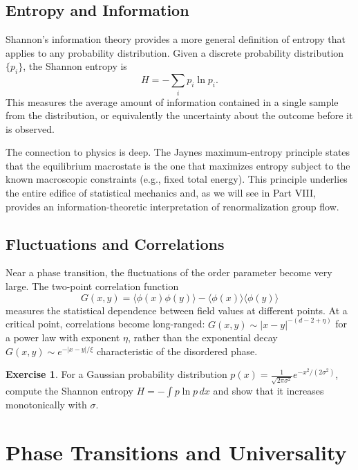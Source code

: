 \documentclass[12pt,a4paper,oneside]{book}
\theoremstyle{definition}
\newtheorem{exercise}{Exercise}[chapter]
\theoremstyle{plain}
\theoremstyle{remark}
\begin{document}
\section{Entropy and Information}

Shannon's information theory provides a more general definition of entropy
that applies to any probability distribution. Given a discrete probability
distribution $\{p_i\}$, the Shannon entropy is
\begin{equation}
H = -\sum_i p_i \ln p_i.
\end{equation}
This measures the average amount of information contained in a single
sample from the distribution, or equivalently the uncertainty about the
outcome before it is observed.

The connection to physics is deep. The Jaynes maximum-entropy principle
states that the equilibrium macrostate is the one that maximizes entropy
subject to the known macroscopic constraints (e.g., fixed total energy).
This principle underlies the entire edifice of statistical mechanics and,
as we will see in Part VIII, provides an information-theoretic interpretation
of renormalization group flow.

\section{Fluctuations and Correlations}

Near a phase transition, the fluctuations of the order parameter become very
large. The two-point correlation function
\begin{equation}
G(x,y) = \langle\phi(x)\phi(y)\rangle - \langle\phi(x)\rangle\langle\phi(y)\rangle
\end{equation}
measures the statistical dependence between field values at different points.
At a critical point, correlations become long-ranged: $G(x,y) \sim |x-y|^{-(d-2+\eta)}$
for a power law with exponent $\eta$, rather than the exponential decay
$G(x,y) \sim e^{-|x-y|/\xi}$ characteristic of the disordered phase.

\begin{exercise}
For a Gaussian probability distribution $p(x) = \frac{1}{\sqrt{2\pi\sigma^2}}
e^{-x^2/(2\sigma^2)}$, compute the Shannon entropy $H = -\int p\ln p\,dx$
and show that it increases monotonically with $\sigma$.
\end{exercise}

\chapter{Phase Transitions and Universality}
\end{document}
